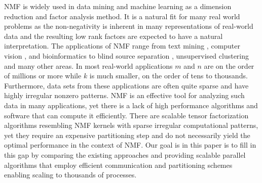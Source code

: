NMF is widely used in data mining and machine learning as a dimension reduction and factor analysis method.
It is a natural fit for many real world problems as the non-negativity is inherent in many representations of real-world data and
the resulting low rank factors are expected to have a natural interpretation. The applications of NMF range from text mining \cite{pauca2004text},  computer vision \cite{hoyer2004non}, and bioinformatics \cite{kim2007sparse} to blind source separation  \cite{cichocki2009nonnegative}, unsupervised clustering \cite{kuang2012symmetric,kuang2013symnmf}  and many other areas.
In most real-world applications $m$ and $n$ are on the order of millions or more while $k$ is much smaller, on the order of tens to thousands.
Furthermore, data sets from these applications are often quite sparse and have highly irregular nonzero patterns.
NMF is an effective tool for analyzing such data in many applications, yet there is a lack of high performance algorithms and software that can compute it efficiently.
There are scalable tensor factorization algorithms resembling NMF kernels with sparse irregular computational patterns, yet they require an expensive partitioning step and do not necessarily yield the optimal performance in the context of NMF.
Our goal is in this paper is to fill in this gap by comparing the existing approaches and providing scalable parallel algorithms that employ efficient communication and partitioning schemes enabling scaling to thousands of processes.



